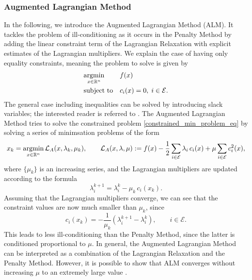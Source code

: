\subsubsection{Augmented Lagrangian Method}
In the following, we introduce the Augmented Lagrangian Method (ALM). It tackles the problem of ill-conditioning as it occurs in the Penalty Method by adding the linear constraint term of the Lagrangian Relaxation with explicit estimates of the Lagrangian multipliers. We explain the case of having only equality constraints, meaning the problem to solve is given by 
\begin{equation}
\label{constrained_min_problem_eq}
\begin{aligned}
& \underset{x \in \mathbb{R}^n}{\operatorname*{argmin}}
& & f(x) \\
& \text{subject to}
& & c_i(x) = 0, \; i \in \mathcal{E}.
\end{aligned}
\end{equation}
The general case including inequalities can be solved by introducing slack variables; the interested reader is referred to \cite{NoceWrig06}.
The Augmented Lagrangian Method tries to solve the constrained problem \ref{constrained_min_problem_eq} by solving a series of minimsation problems of the form
\[x_k = \operatorname*{argmin}_{x \in \mathbb{R}^n} \mathcal{L}_A(x, \lambda_k, \mu_k), \qquad \mathcal{L}_A(x, \lambda, \mu) := f(x) - \frac{1}{2}\sum_{i \in \mathcal{E}} \lambda_i \,c_i(x) + \mu \sum_{i \in \mathcal{E}} c_i^2(x),\]
where $\{\mu_k\}$ is an increasing series, and the Lagrangian multipliers are updated according to the formula
\begin{equation}
\lambda_i^{k+1} = \lambda_i^k - \mu_k\,c_i(x_k).
\label{eq:alm_update}
\end{equation}
Assuming that the Lagrangian multipliers converge, we can see that the constraint values are now much smaller than $\mu_k$, since 
\[ c_i(x_k) = -\frac{1}{\mu_k}(\lambda_i^{k+1} - \lambda_i^k), \qquad i\in \mathcal{E}. \]
This leads to less ill-conditioning than the Penalty Method, since the latter is conditioned proportional to $\mu$.
In general, the Augmented Lagrangian Method can be interpreted as a combination of the Lagrangian Relaxation and the Penalty Method. However, it is possible to show that ALM converges without increasing $\mu$ to an extremely large value \cite{NoceWrig06}.


